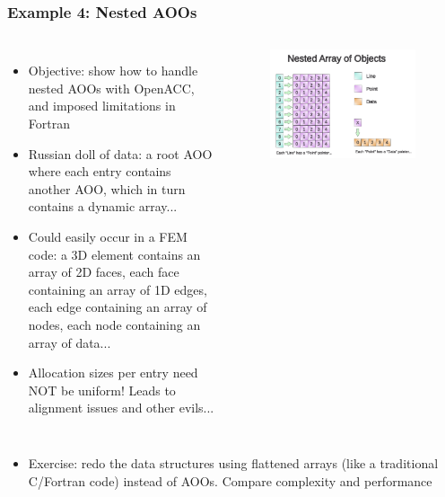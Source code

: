 \begin{frame}
    \frametitle{Example 4: Nested AOOs}
    \begin{columns}
            \begin{itemize}
                \item Objective: show how to handle nested AOOs with OpenACC, and imposed limitations in Fortran
                \item Russian doll of data: a root AOO where each entry contains another AOO, which in turn contains a dynamic array...
                \item Could easily occur in a FEM code: a 3D element contains an array of 2D faces, each face containing an array of 1D edges, each edge containing an array of nodes, each node containing an array of data...
                \item Allocation sizes per entry need NOT be uniform! Leads to alignment issues and other evils...
            \end{itemize}
            \begin{figure}
                \centering
                \includegraphics[width=0.95\textwidth]{images/AOO_layout.pdf}
            \end{figure}
    \end{columns}
\end{frame}

\begin{frame}
    \begin{itemize}
        \item Exercise: redo the data structures using flattened arrays (like a traditional C/Fortran code) instead of AOOs. Compare complexity and performance
    \end{itemize}
\end{frame}